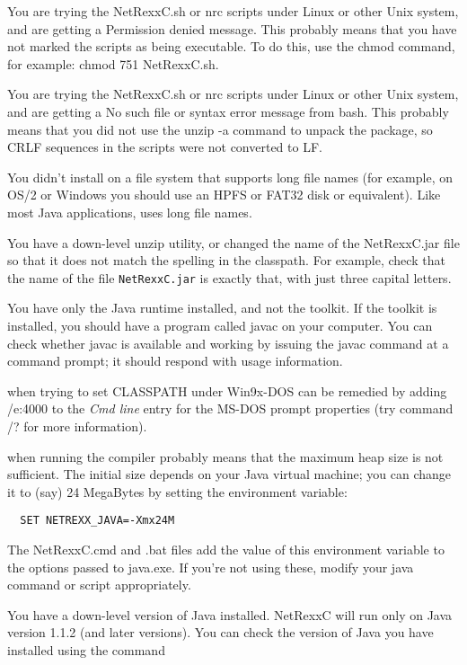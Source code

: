 \begin{description}
\item[Permission Denied] You are trying the NetRexxC.sh or nrc scripts under Linux or other Unix system, and are getting a Permission denied message. This probably means that you have not marked the scripts as being executable. To do this, use the chmod command, for example: chmod 751 NetRexxC.sh.
\item[No such file]  You are trying the NetRexxC.sh or nrc scripts under Linux or other Unix system, and are getting a No such file or syntax error message from bash. This probably means that you did not use the unzip -a command to unpack the \nr{} package, so CRLF sequences in the scripts were not converted to LF.
\item You didn't install on a file system that supports long file names (for example, on OS/2 or Windows you should use an HPFS or FAT32 disk or equivalent). Like most Java applications, \nr{} uses long file names.
\item[Downlevel zip] You have a down-level unzip utility, or changed the name of the NetRexxC.jar file so that it does not match the spelling in the classpath. For example, check that the name of the file \texttt{NetRexxC.jar} is exactly that, with just three capital letters.
\item You have only the Java runtime installed, and not the toolkit. If the toolkit is installed, you should have a program called javac on your computer. You can check whether javac is available and working by issuing the javac command at a command prompt; it should respond with usage information.
\item[out of environment space] when trying to set CLASSPATH under Win9x-DOS can be remedied by adding /e:4000 to the \emph{Cmd line} entry for the MS-DOS prompt properties (try command /? for more information).
\item[java.lang.OutOfMemoryError] when running the compiler probably means that the maximum heap size is not sufficient. The initial size depends on your Java virtual machine; you can change it to (say) 24 MegaBytes by setting the environment variable:
\begin{verbatim}
  SET NETREXX_JAVA=-Xmx24M
\end{verbatim}
The NetRexxC.cmd and .bat files add the value of this environment variable to the options passed to java.exe. If you're not using these, modify your java command or script appropriately.
\item[Down-level Java]  You have a down-level version of Java installed. NetRexxC will run only on Java version 1.1.2 (and later versions). You can check the version of Java you have installed using the command 

\end{description}
